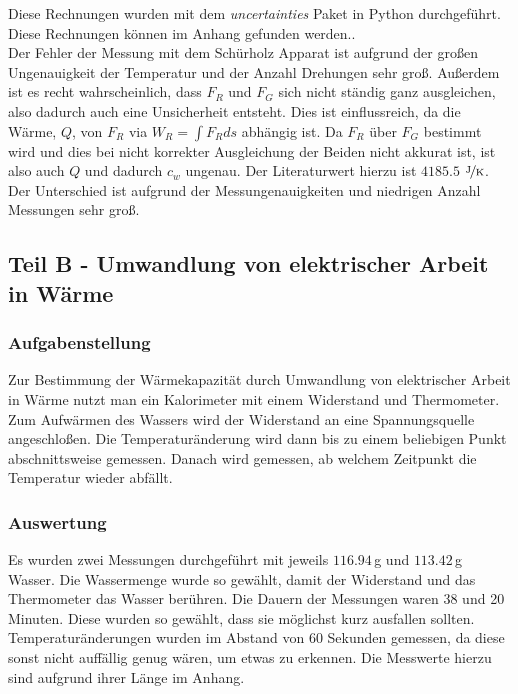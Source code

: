 \documentclass[11pt,a4paper]{article}
\begin{document}
Diese Rechnungen wurden mit dem \textit{uncertainties} Paket in Python durchgef\"uhrt. Diese Rechnungen k\"onnen im Anhang gefunden werden..\\

Der Fehler der Messung mit dem Sch\"urholz Apparat ist aufgrund der gro\ss en Ungenauigkeit der Temperatur und der Anzahl Drehungen sehr gro\ss. Au\ss erdem ist es recht wahrscheinlich, dass $F_{R}$ und $F_{G}$ sich nicht st\"andig ganz ausgleichen, also dadurch auch eine Unsicherheit entsteht. Dies ist einflussreich, da die W\"arme, $Q$, von $F_R$ via $W_R=\int F_Rds$ abh\"angig ist. Da $F_R$ \"uber $F_G$ bestimmt wird und dies bei nicht korrekter Ausgleichung der Beiden nicht akkurat ist, ist also auch $Q$ und dadurch $c_w$ ungenau. Der Literaturwert hierzu ist $4185.5$ $\mathrm{\nicefrac{\mathrm{J}}{K}}$. Der Unterschied ist aufgrund der Messungenauigkeiten und niedrigen Anzahl Messungen sehr gro\ss.


\subsection{Teil B - Umwandlung von elektrischer Arbeit in Wärme}

\subsubsection{Aufgabenstellung}

Zur Bestimmung der W\"armekapazit\"at durch Umwandlung von elektrischer Arbeit in W\"arme nutzt man ein Kalorimeter mit einem Widerstand und Thermometer. Zum Aufw\"armen des Wassers wird der Widerstand an eine Spannungsquelle angeschlo\ss en. Die Temperatur\"anderung wird dann bis zu einem beliebigen Punkt abschnittsweise gemessen. Danach wird gemessen, ab welchem Zeitpunkt die Temperatur wieder abf\"allt.

\subsubsection{Auswertung}

Es wurden zwei Messungen durchgef\"uhrt mit jeweils $116.94\,$g und $113.42\,$g Wasser. Die Wassermenge wurde so gew\"ahlt, damit der Widerstand und das Thermometer das Wasser ber\"uhren. Die Dauern der Messungen waren 38 und 20 Minuten. Diese wurden so gew\"ahlt, dass sie m\"oglichst kurz ausfallen sollten. Temperatur\"anderungen wurden im Abstand von 60 Sekunden gemessen, da diese sonst nicht auff\"allig genug w\"aren, um etwas zu erkennen. Die Messwerte hierzu sind aufgrund ihrer L\"ange im Anhang.











\end{document}
